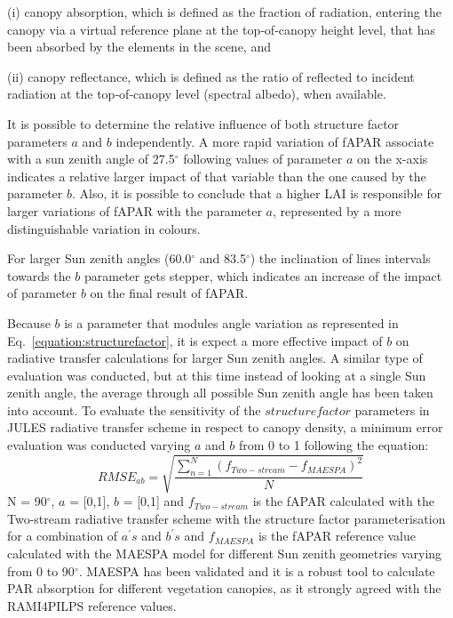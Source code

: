 (i) canopy absorption, which is defined as the fraction of radiation, entering the canopy via a virtual reference plane at the top‐of‐canopy height level, that has been absorbed by the elements in the scene, and 

(ii) canopy reflectance, which is defined as the ratio of reflected to incident radiation at the top‐of‐canopy level (spectral albedo), when available.

It is possible to determine the relative influence of both structure factor parameters $a$ and $b$ independently. A more rapid variation of fAPAR associate with a sun zenith angle of 27.5$^{\circ}$ following values of parameter $a$ on the x-axis indicates a relative larger impact of that variable than the one caused by the parameter $b$. Also, it is possible to conclude that a higher LAI is responsible for larger variations of fAPAR with the parameter $a$, represented by a more distinguishable variation in colours. 

For larger Sun zenith angles (60.0$^{\circ}$ and 83.5$^{\circ}$) the inclination of lines intervals towards the $b$ parameter gets stepper, which indicates an increase of the impact of parameter $b$ on the final result of fAPAR. 

Because $b$ is a parameter that modules angle variation as represented in Eq.~\ref{equation:structurefactor}, it is expect a more effective impact of $b$ on radiative transfer calculations for larger Sun zenith angles. A similar type of evaluation was conducted, but at this time instead of looking at a single Sun zenith angle, the average through all possible Sun zenith angle has been taken into account. To evaluate the sensitivity of the $structure factor$ parameters in JULES radiative transfer scheme in respect to canopy density, a minimum error evaluation was conducted varying $a$ and $b$ from 0 to 1 following the equation:
\begin{equation}
RMSE_{ab} = \sqrt{\frac{\sum_{n=1}^{N} (f_{Two-stream} - f_{MAESPA})^2}{N}}
\label{equation:rmseab}
\end{equation}
\noindent N = 90$^{\circ}$, $a$ = [0,1], $b$ = [0,1] and $f_{Two-stream}$ is the fAPAR calculated with the Two-stream radiative transfer scheme with the structure factor parameterisation for a combination of $a^{\prime}s$ and $b^{\prime}s$ and  $f_{MAESPA}$ is the fAPAR reference value calculated with the MAESPA model for different Sun zenith geometries varying from 0 to 90$^{\circ}$. MAESPA has been validated and it is a robust tool to calculate PAR absorption for different vegetation canopies, as it strongly agreed with the RAMI4PILPS reference values. 

